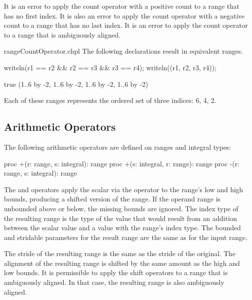 It is an error to apply the count operator with a positive count to a range that
has no first index.  It is also an error to apply the count operator
with a negative count to a range that has no last index.
It is an error to apply the count operator to a range that is ambiguously aligned.

\begin{chapelexample}{rangeCountOperator.chpl}
The following declarations result in equivalent ranges.
\begin{chapelpost}
writeln(r1 == r2 \&\& r2 == r3 \&\& r3 == r4);
writeln((r1, r2, r3, r4));
\end{chapelpost}
\begin{chapeloutput}
true
(1..6 by -2, 1..6 by -2, 1..6 by -2, 1..6 by -2)
\end{chapeloutput}
Each of these ranges represents the ordered set of three indices: 6, 4, 2.
\end{chapelexample}

\subsection{Arithmetic Operators}
\label{Range_Arithmetic}

The following arithmetic operators are defined on ranges and integral
types:

\begin{chapel}
proc +(r: range, s: integral): range
proc +(s: integral, r: range): range
proc -(r: range, s: integral): range
\end{chapel}

The \chpl{+} and \chpl{-} operators apply the scalar via the operator
to the range's low and high bounds, producing a shifted version of the
range.  If the operand range is unbounded above or below, the missing bounds
are ignored.
The index type of the resulting range is the type of the value
that would result from an addition between the scalar value and a value
with the range's index type.  The bounded and stridable parameters for
the result range are the same as for the input range.

The stride of the resulting range is the same as the stride of the
original. The alignment of the resulting range is shifted by the same amount as
the high and low bounds.  It is permissible to apply the shift operators to a
range that is ambiguously aligned.  In that case, the resulting range is also
ambiguously aligned.

